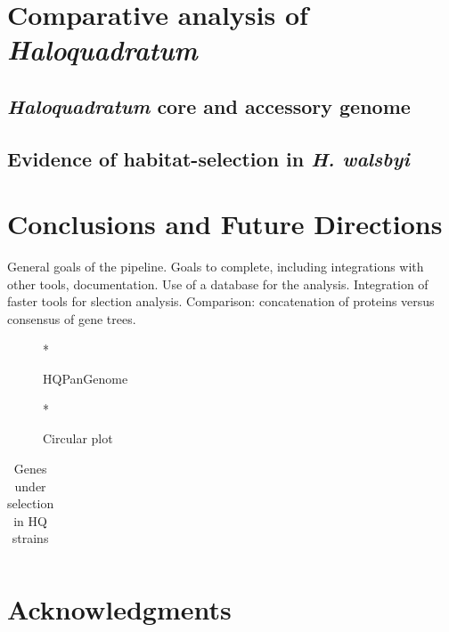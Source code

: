 \section{Comparative analysis of \textit{Haloquadratum}}

\subsection{\textit{Haloquadratum} core and accessory genome}

\subsection{Evidence of habitat-selection in \textit{H. walsbyi}}

\section{Conclusions and Future Directions}

General goals of the pipeline.
Goals to complete, including integrations with other tools, documentation. Use of a database for the analysis. Integration of faster tools for slection analysis.
Comparison: concatenation of proteins versus consensus of gene trees.


\begin{figure}[htbp]
	\centering
	*
	\caption{HQPanGenome}
	\label{HQPanGenome}
\end{figure}

\begin{figure}[htbp]
	\centering
	*
	\caption{Circular plot}
	\label{HQCircularPlot}
\end{figure}

\begin{table}[htdp]
\caption{Genes under selection in HQ strains}
\begin{center}
\begin{tabular}{|c|c|}

\end{tabular}
\end{center}
\label{SelectionHQ}
\end{table}%


\section{Acknowledgments}

%
%